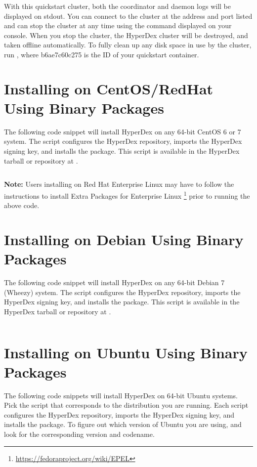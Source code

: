With this quickstart cluster, both the coordinator and daemon logs will be
displayed on stdout.  You can connect to the cluster at the address and port
listed and can stop the cluster at any time using the command displayed on your
console.  When you stop the cluster, the HyperDex cluster will be destroyed, and
taken offline automatically.  To fully clean up any disk space in use by the
cluster, run , where b6ae7c60c275 is the ID of your
quickstart container.

\section{Installing on CentOS/RedHat Using Binary Packages}

The following code snippet will install HyperDex on any 64-bit CentOS 6 or 7
system.  The script configures the HyperDex repository, imports the HyperDex
signing key, and installs the  package.  This script is available
in the HyperDex tarball or repository at .

\inputminted[frame=lines,framesep=2mm,firstline=5]{bash}{\topdir/install/centos-packages.sh}

\noindent\textbf{Note:}  Users installing on Red Hat Enterprise Linux may have
to follow the instructions to install Extra Packages for Enterprise Linux
\footnote{\url{https://fedoraproject.org/wiki/EPEL}} prior to running the above
code.

\section{Installing on Debian Using Binary Packages}

The following code snippet will install HyperDex on any 64-bit Debian 7 (Wheezy)
system.  The script configures the HyperDex repository, imports the HyperDex
signing key, and installs the  package.  This script is available
in the HyperDex tarball or repository at .

\inputminted[frame=lines,framesep=2mm,firstline=5]{bash}{\topdir/install/debian7-packages.sh}

\section{Installing on Ubuntu Using Binary Packages}

The following code snippets will install HyperDex on 64-bit Ubuntu systems.
Pick the script that corresponds to the distribution you are running.  Each
script configures the HyperDex repository, imports the HyperDex signing key, and
installs the  package.  To figure out which version of Ubuntu you
are using,  and look for the corresponding version and
codename.

